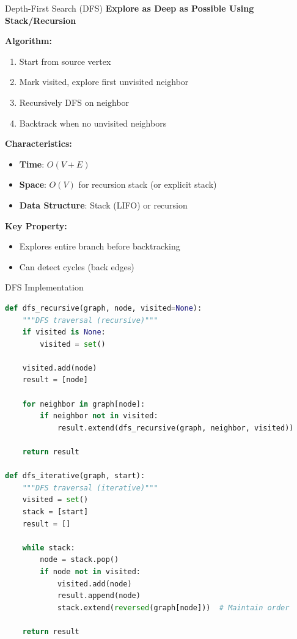 \documentclass[aspectratio=169]{beamer}
\begin{document}
\begin{frame}{Depth-First Search (DFS)}
  \textbf{Explore as Deep as Possible Using Stack/Recursion}

  \vspace{0.3cm}
  \textbf{Algorithm:}
  \begin{enumerate}
    \item Start from source vertex
    \item Mark visited, explore first unvisited neighbor
    \item Recursively DFS on neighbor
    \item Backtrack when no unvisited neighbors
  \end{enumerate}

  \vspace{0.3cm}
  \textbf{Characteristics:}
  \begin{itemize}
    \item \textbf{Time}: $O(V + E)$
    \item \textbf{Space}: $O(V)$ for recursion stack (or explicit stack)
    \item \textbf{Data Structure}: Stack (LIFO) or recursion
  \end{itemize}

  \vspace{0.3cm}
  \textbf{Key Property:}
  \begin{itemize}
    \item Explores entire branch before backtracking
    \item Can detect cycles (back edges)
  \end{itemize}
\end{frame}

\begin{frame}[fragile]{DFS Implementation}
\begin{lstlisting}[language=Python, basicstyle=\ttfamily\tiny]
def dfs_recursive(graph, node, visited=None):
    """DFS traversal (recursive)"""
    if visited is None:
        visited = set()

    visited.add(node)
    result = [node]

    for neighbor in graph[node]:
        if neighbor not in visited:
            result.extend(dfs_recursive(graph, neighbor, visited))

    return result

def dfs_iterative(graph, start):
    """DFS traversal (iterative)"""
    visited = set()
    stack = [start]
    result = []

    while stack:
        node = stack.pop()
        if node not in visited:
            visited.add(node)
            result.append(node)
            stack.extend(reversed(graph[node]))  # Maintain order

    return result
\end{lstlisting}
\end{frame}
\end{document}
